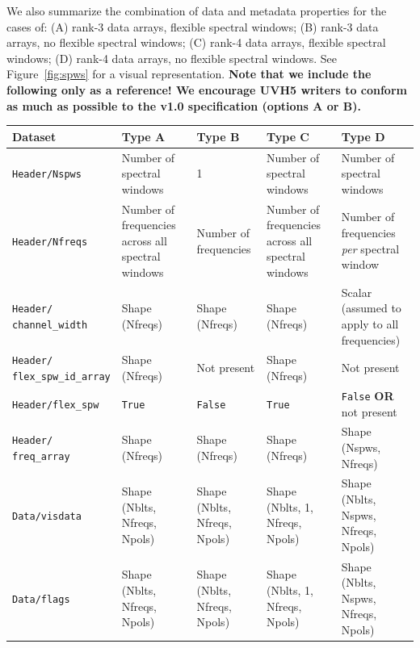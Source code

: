 \documentclass[11pt, oneside]{article}
\begin{document}
We also summarize the combination of data and metadata properties for the cases
of: (A) rank-3 data arrays, flexible spectral windows; (B) rank-3 data arrays,
no flexible spectral windows; (C) rank-4 data arrays, flexible spectral windows;
(D) rank-4 data arrays, no flexible spectral windows. See Figure~\ref{fig:spws}
for a visual representation. \textbf{Note that we include the following only as
  a reference! We encourage UVH5 writers to conform as much as possible to the
  v1.0 specification (options A or B).}

\begin{table}[t]
  \scriptsize
  \begin{center}
    \begin{tabular}{ m{8em} | m{10em} | m{10em} | m{10em} | m{10em}}
      \textbf{Dataset} & \textbf{Type A} & \textbf{Type B} & \textbf{Type C} & \textbf{Type D} \\ \hline\hline
      \texttt{Header/Nspws} & Number of spectral windows & 1 & Number of spectral windows & Number of spectral windows \\ \hline
      \texttt{Header/Nfreqs} & Number of frequencies across all spectral windows & Number of frequencies & Number of frequencies across all spectral windows & Number of frequencies \textit{per} spectral window \\ \hline
      \makecell[cl]{\texttt{Header/}\\\texttt{channel\_width}} & Shape (Nfreqs) & Shape (Nfreqs) & Shape (Nfreqs) & Scalar (assumed to apply to all frequencies) \\[1.75em] \hline
      \makecell[cl]{\texttt{Header/}\\\texttt{flex\_spw\_id\_array}} & Shape (Nfreqs) & Not present & Shape (Nfreqs) & Not present \\[1.75em] \hline
      \texttt{Header/flex\_spw} & \texttt{True} & \texttt{False} & \texttt{True} & \texttt{False} \textbf{OR} not present \\[1.75em] \hline
      \makecell[cl]{\texttt{Header/}\\\texttt{freq\_array}} & Shape (Nfreqs) & Shape (Nfreqs) & Shape (Nfreqs) & Shape (Nspws, Nfreqs) \\[1.75em] \hline
      \texttt{Data/visdata} & Shape (Nblts, Nfreqs, Npols) & Shape (Nblts, Nfreqs, Npols) & Shape (Nblts, 1, Nfreqs, Npols) & Shape (Nblts, Nspws, Nfreqs, Npols) \\[1.75em] \hline
      \texttt{Data/flags} & Shape (Nblts, Nfreqs, Npols) & Shape (Nblts, Nfreqs, Npols) & Shape (Nblts, 1, Nfreqs, Npols) & Shape (Nblts, Nspws, Nfreqs, Npols) \\[1.75em] \hline

\end{tabular}
\end{center}
\end{table}
\end{document}
